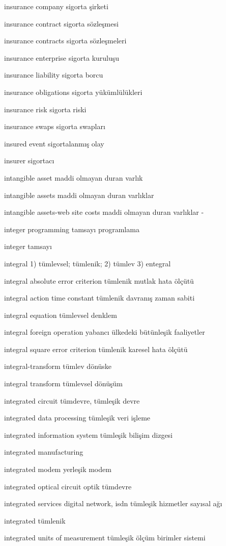 \documentclass[12pt,fleqn]{article}\usepackage{../../common}
\begin{document}
insurance company sigorta şirketi

insurance contract sigorta sözleşmesi

insurance contracts sigorta sözleşmeleri

insurance enterprise sigorta kuruluşu

insurance liability sigorta borcu

insurance obligations sigorta yükümlülükleri

insurance risk sigorta riski

insurance swaps sigorta swapları

insured event sigortalanmış olay

insurer sigortacı

intangible asset maddi olmayan duran varlık

intangible assets maddi olmayan duran varlıklar

intangible assets-web site costs maddi olmayan duran varlıklar -

integer programming tamsayı programlama

integer tamsayı

integral 1) tümlevsel; tümlenik; 2) tümlev 3) entegral

integral absolute error criterion tümlenik mutlak hata ölçütü

integral action time constant tümlenik davranış zaman sabiti

integral equation tümlevsel denklem

integral foreign operation yabancı ülkedeki bütünleşik faaliyetler

integral square error criterion tümlenik karesel hata ölçütü

integral-transform tümlev dönüske

integral transform tümlevsel dönüşüm

integrated circuit tümdevre, tümleşik devre

integrated data processing tümleşik veri işleme

integrated information system tümleşik bilişim dizgesi

integrated manufacturing

integrated modem yerleşik modem

integrated optical circuit optik tümdevre

integrated services digital network, isdn tümleşik hizmetler sayısal ağı

integrated tümlenik

integrated units of measurement tümleşik ölçüm birimler sistemi
\end{document}
